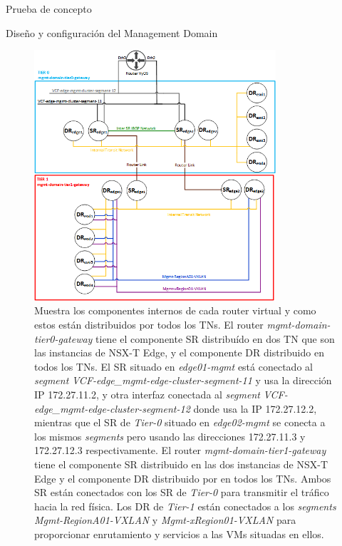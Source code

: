\begin{section}{Prueba de concepto}
\begin{subsection}{Diseño y configuración del Management Domain}
    \begin{figure}[h]
      \centering
      \includegraphics[width=0.8\textwidth]{imaxes/pruebaconcepto/EstructuraInternaTiers.png}
      \caption{Muestra los componentes internos de cada router virtual y como estos están distribuidos por todos los TNs. El router \textit{mgmt-domain-tier0-gateway} tiene el componente SR distribuído en dos TN que son las instancias de NSX-T Edge, y el componente DR distribuido en todos los TNs. El SR situado en \textit{edge01-mgmt} está conectado al \textit{segment} \textit{VCF-edge\_mgmt-edge-cluster-segment-11} y usa la dirección IP 172.27.11.2, y otra interfaz conectada al \textit{segment} \textit{VCF-edge\_mgmt-edge-cluster-segment-12} donde usa la IP 172.27.12.2, mientras que el SR de \textit{Tier-0} situado en \textit{edge02-mgmt} se conecta a los mismos \textit{segments} pero usando las direcciones 172.27.11.3 y 172.27.12.3 respectivamente. El router \textit{mgmt-domain-tier1-gateway} tiene el componente SR distribuido en las dos instancias de NSX-T Edge y el componente DR distribuido por en todos los TNs. Ambos SR están conectados con los SR de \textit{Tier-0} para transmitir el tráfico hacia la red física. Los DR de \textit{Tier-1} están conectados a los \textit{segments} \textit{Mgmt-RegionA01-VXLAN} y \textit{Mgmt-xRegion01-VXLAN} para proporcionar enrutamiento y servicios a las VMs situadas en ellos.}
      \label{fig:estructura-interna-TwoTier-Routing-NSXT}
    \end{figure}
    \FloatBarrier
    

\end{subsection}
\end{section}
